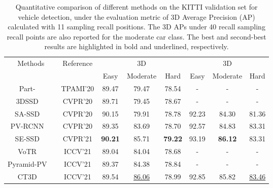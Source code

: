 \documentclass[twocolumn]{svjour3}
\begin{document}
\setlength{\tabcolsep}{12pt}
\begin{table*}[htp]
\centering
\caption{Quantitative comparison of different methods on the KITTI validation set for vehicle detection, under the evaluation metric of 3D Average Precision (AP) calculated with 11 sampling recall positions. The 3D APs under 40 recall sampling recall points are also reported for the moderate car class. The best and second-best results are highlighted in bold and underlined, respectively.}
\label{table:kitti_val}
\begin{tabular}{c|c|ccc|ccc} 
\hline
\multirow{2}{*}{Methods} & \multirow{2}{*}{Reference} & \multicolumn{3}{c|}{3D } & \multicolumn{3}{c}{3D }  \\
&                            & Easy  & Moderate & Hard                     & Easy  & Moderate & Hard                     \\ 
\hline
Part-~\citep{shi2020points}~             & TPAMI'20                 & 89.47 & 79.47    & 78.54                    & -     & -        & -                      \\
3DSSD~\citep{yang20203dssd}~                  & CVPR'20                  & 89.71 & 79.45    & 78.67                    & -     & -        & -                      \\
SA-SSD~\citep{He_2020_CVPR}~                 & CVPR'20                  & 90.15 & 79.91    & 78.78                    & 92.23 & 84.30    & 81.36                  \\
PV-RCNN~\citep{shi2020pv}~                & CVPR'20                  & 89.35 & 83.69    & 78.70                    & 92.57 & 84.83    & 83.31                  \\
SE-SSD~\citep{zheng2021se}~                 & CVPR'21                  & \textbf{90.21} & 85.71    & \textbf{79.22}                    & 93.19 & \textbf{86.12}    & 83.31                  \\
VoTR~\citep{mao2021voxel}~                   & ICCV'21                  & 89.04 & 84.04    & 78.68                    & -     & -        & -                      \\
Pyramid-PV~\citep{Mao_2021_ICCV}~             & ICCV'21                  & 89.37 & 84.38    & 78.84                    & -     & -        & -                      \\
CT3D~\citep{sheng2021improving}~                   & ICCV'21                  & 89.54 & \underline{86.06}    & 78.99                    & 92.85 & 85.82    & \underline{83.46}                  \\ 

\end{tabular}
\end{table*}
\end{document}
